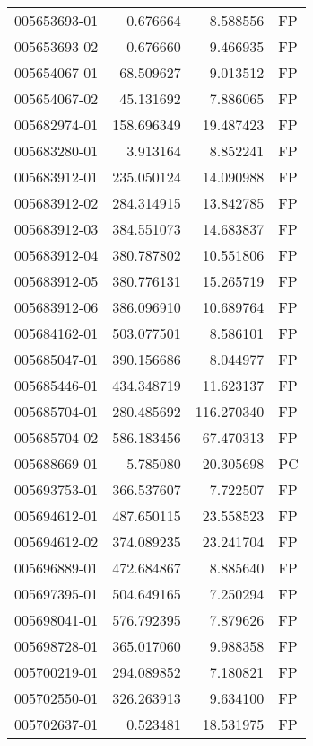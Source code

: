 \begin{tabular}{lrrl}
005653693-01 &    0.676664 &       8.588556 &   FP \\
005653693-02 &    0.676660 &       9.466935 &   FP \\
005654067-01 &   68.509627 &       9.013512 &   FP \\
005654067-02 &   45.131692 &       7.886065 &   FP \\
005682974-01 &  158.696349 &      19.487423 &   FP \\
005683280-01 &    3.913164 &       8.852241 &   FP \\
005683912-01 &  235.050124 &      14.090988 &   FP \\
005683912-02 &  284.314915 &      13.842785 &   FP \\
005683912-03 &  384.551073 &      14.683837 &   FP \\
005683912-04 &  380.787802 &      10.551806 &   FP \\
005683912-05 &  380.776131 &      15.265719 &   FP \\
005683912-06 &  386.096910 &      10.689764 &   FP \\
005684162-01 &  503.077501 &       8.586101 &   FP \\
005685047-01 &  390.156686 &       8.044977 &   FP \\
005685446-01 &  434.348719 &      11.623137 &   FP \\
005685704-01 &  280.485692 &     116.270340 &   FP \\
005685704-02 &  586.183456 &      67.470313 &   FP \\
005688669-01 &    5.785080 &      20.305698 &   PC \\
005693753-01 &  366.537607 &       7.722507 &   FP \\
005694612-01 &  487.650115 &      23.558523 &   FP \\
005694612-02 &  374.089235 &      23.241704 &   FP \\
005696889-01 &  472.684867 &       8.885640 &   FP \\
005697395-01 &  504.649165 &       7.250294 &   FP \\
005698041-01 &  576.792395 &       7.879626 &   FP \\
005698728-01 &  365.017060 &       9.988358 &   FP \\
005700219-01 &  294.089852 &       7.180821 &   FP \\
005702550-01 &  326.263913 &       9.634100 &   FP \\
005702637-01 &    0.523481 &      18.531975 &   FP \\

\end{tabular}
